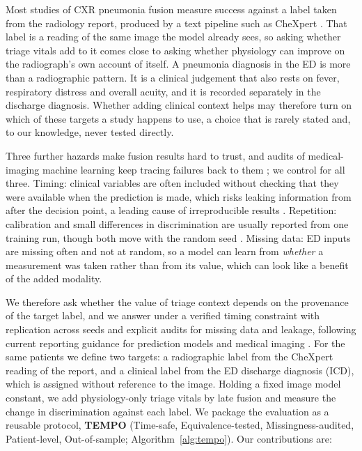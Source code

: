 \documentclass[twocolumn, final]{svjour3}
\begin{document}
Most studies of CXR pneumonia fusion measure success against a label taken from the
radiology report, produced by a text pipeline such as CheXpert \citep{irvin2019chexpert}.
That label is a reading of the same image the model already sees, so asking whether triage
vitals add to it comes close to asking whether physiology can improve on the radiograph's
own account of itself. A pneumonia diagnosis in the ED is more than a radiographic
pattern. It is a clinical judgement that also rests on fever, respiratory distress and
overall acuity, and it is recorded separately in the discharge diagnosis. Whether adding
clinical context helps may therefore turn on which of these targets a study happens to
use, a choice that is rarely stated and, to our knowledge, never tested directly.

Three further hazards make fusion results hard to trust, and audits of medical-imaging
machine learning keep tracing failures back to them
\citep{roberts2021pitfalls,varoquaux2022failures}; we control for all three. Timing:
clinical variables are often included without checking that they were available when the
prediction is made, which risks leaking information from after the decision point, a
leading cause of irreproducible results \citep{kapoor2023leakage}. Repetition: calibration
and small differences in discrimination are usually reported from one training run, though
both move with the random seed \citep{guo2017calibration,nixon2019measuring}. Missing data:
ED inputs are missing often and not at random, so a model can learn from \emph{whether} a
measurement was taken rather than from its value, which can look like a benefit of the added
modality.

We therefore ask whether the value of triage context depends on the provenance of the
target label, and we answer under a verified timing constraint with replication across
seeds and explicit audits for missing data and leakage, following current reporting
guidance for prediction models and medical imaging
\citep{collins2024tripodai,tejani2024claim}. For the same patients we define two targets:
a radiographic label from the CheXpert reading of the report, and a clinical label from
the ED discharge diagnosis (ICD), which is assigned without reference to the image.
Holding a fixed image model constant, we add physiology-only triage vitals by late fusion
and measure the change in discrimination against each label. We package the evaluation as
a reusable protocol, \textbf{TEMPO} (Time-safe, Equivalence-tested, Missingness-audited,
Patient-level, Out-of-sample; Algorithm~\ref{alg:tempo}). Our contributions are:
\end{document}
